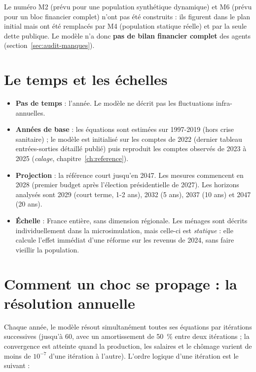 Le numéro M2 (prévu pour une population synthétique dynamique) et M6 (prévu pour un bloc financier complet) n'ont pas
été construits : ils figurent dans le plan initial mais ont été remplacés par M4 (population statique réelle) et par
la seule dette publique. Le modèle n'a donc \textbf{pas de bilan financier complet} des agents (section~\ref{sec:audit-manques}).

\section{Le temps et les échelles}

\begin{itemize}
\item \textbf{Pas de temps} : l'année. Le modèle ne décrit pas les fluctuations infra-annuelles.
\item \textbf{Années de base} : les équations sont estimées sur 1997-2019 (hors crise sanitaire) ; le modèle est
initialisé sur les comptes de 2022 (dernier tableau entrées-sorties détaillé publié) puis reproduit les comptes
observés de 2023 à 2025 (\emph{calage}, chapitre~\ref{ch:reference}).
\item \textbf{Projection} : la référence court jusqu'en 2047. Les mesures commencent en 2028 (premier budget après
l'élection présidentielle de 2027). Les horizons analysés sont 2029 (court terme, 1-2 ans), 2032 (5 ans), 2037
(10 ans) et 2047 (20 ans).
\item \textbf{Échelle} : France entière, sans dimension régionale. Les ménages sont décrits individuellement dans la
microsimulation, mais celle-ci est \emph{statique} : elle calcule l'effet immédiat d'une réforme sur les revenus de
2024, sans faire vieillir la population.
\end{itemize}

\section{Comment un choc se propage : la résolution annuelle}
\label{sec:propagation}

Chaque année, le modèle résout simultanément toutes ses équations par itérations successives (jusqu'à 60, avec un
amortissement de 50~\% entre deux itérations ; la convergence est atteinte quand la production, les salaires et le
chômage varient de moins de $10^{-7}$ d'une itération à l'autre). L'ordre logique d'une itération est le suivant :

